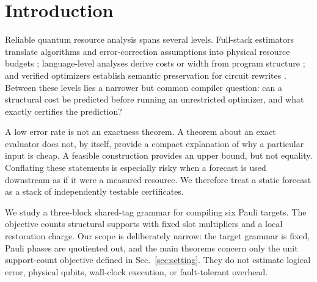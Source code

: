 \section{Introduction}

Reliable quantum resource analysis spans several levels. Full-stack estimators translate algorithms and error-correction assumptions into physical resource budgets \cite{vandam2023azure}; language-level analyses derive costs or width from program structure \cite{avanzini2022qet,colledan2025flexible,colledan2025width}; and verified optimizers establish semantic preservation for circuit rewrites \cite{hietala2021voqc,tao2022giallar}. Between these levels lies a narrower but common compiler question: can a structural cost be predicted before running an unrestricted optimizer, and what exactly certifies the prediction?

A low error rate is not an exactness theorem. A theorem about an exact evaluator does not, by itself, provide a compact explanation of why a particular input is cheap. A feasible construction provides an upper bound, but not equality. Conflating these statements is especially risky when a forecast is used downstream as if it were a measured resource. We therefore treat a static forecast as a stack of independently testable certificates.

We study a three-block shared-tag grammar for compiling six Pauli targets. The objective counts structural supports with fixed slot multipliers and a local restoration charge. Our scope is deliberately narrow: the target grammar is fixed, Pauli phases are quotiented out, and the main theorems concern only the unit support-count objective defined in Sec.~\ref{sec:setting}. They do not estimate logical error, physical qubits, wall-clock execution, or fault-tolerant overhead.


